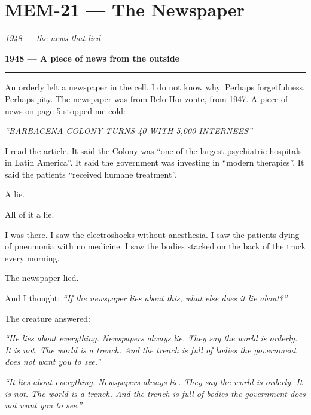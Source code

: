 \section*{\textbf{MEM-21} --- The Newspaper}

\noindent \textit{1948 --- the news that lied}

\noindent \textbf{1948 --- A piece of news from the outside}

\vspace{0.5em}\noindent\rule{\textwidth}{0.5pt}\vspace{0.5em}

\noindent An orderly left a newspaper in the cell. I do not know why. Perhaps forgetfulness. Perhaps pity. The newspaper was from Belo Horizonte, from 1947. A piece of news on page 5 stopped me cold:

\noindent \textit{\textquotedblleft{}BARBACENA COLONY TURNS 40 WITH 5,000 INTERNEES\textquotedblright{}}

\noindent I read the article. It said the Colony was \textquotedblleft{}one of the largest psychiatric hospitals in Latin America\textquotedblright{}. It said the government was investing in \textquotedblleft{}modern therapies\textquotedblright{}. It said the patients \textquotedblleft{}received humane treatment\textquotedblright{}.

\noindent A lie.

\noindent All of it a lie.

\noindent I was there. I saw the electroshocks without anesthesia. I saw the patients dying of pneumonia with no medicine. I saw the bodies stacked on the back of the truck every morning.

\noindent The newspaper lied.

\noindent And I thought: \textit{\textquotedblleft{}If the newspaper lies about this, what else does it lie about?\textquotedblright{}}

\noindent The creature answered:

\noindent \textit{\textquotedblleft{}He lies about everything. Newspapers always lie. They say the world is orderly. It is not. The world is a trench. And the trench is full of bodies the government does not want you to see.\textquotedblright{}}

\noindent \textit{\textquotedblleft{}It lies about everything. Newspapers always lie. They say the world is orderly. It is not. The world is a trench. And the trench is full of bodies the government does not want you to see.\textquotedblright{}}

